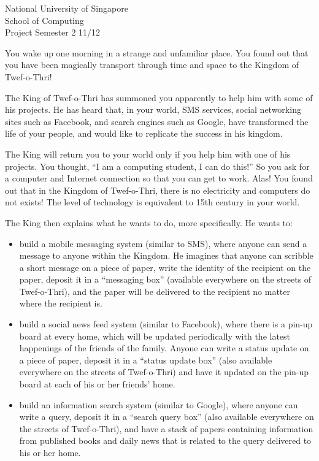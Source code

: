\documentclass[answers,a4paper,11pt]{exam}
\begin{document}
\extraheadheight{.5in}
%
{\large\sf National University of Singapore\\ School of Computing \\
\LARGE\sf Project}%
{\large\sf Semester 2 11/12}
\firstpageheadrule
\pagestyle{headandfoot}

You wake up one morning in a strange and unfamiliar place.  You found out that you have been magically transport through time and space to the Kingdom of Twef-o-Thri!  

The King of Twef-o-Thri has summoned you apparently to help him with some of his projects.  He has heard that, in your world, SMS services, social networking sites such as Facebook, and search engines such as Google, have transformed the life of your people, and would like to replicate the success in his kingdom.  

The King will return you to your world only if you help him with one of his projects.  You thought, ``I am a computing student, I can do this!'' So you ask for a computer and Internet connection so that you can get to work.  Alas!  You found out that in the Kingdom of Twef-o-Thri, there is no electricity and computers do not exists!  The level of technology is equivalent to 15th century in your world.

The King then explains what he wants to do, more specifically.  He wants to:

\begin{itemize}
\item
build a mobile messaging system (similar to SMS), where anyone can send a message to anyone within the Kingdom.  He imagines that anyone can scribble a short message on a piece of paper, write the identity of the recipient on the paper, deposit it in a “messaging box” (available everywhere on the streets of Twef-o-Thri), and the paper will be delivered to the recipient no matter where the recipient is.
\item
build a social news feed system (similar to Facebook), where there is a pin-up board at every home, which will be updated periodically with the latest happenings of the friends of the family.  Anyone can write a status update on a piece of paper, deposit it in a “status update box” (also available everywhere on the streets of Twef-o-Thri) and have it updated on the pin-up board at each of his or her friends’ home.  
\item
build an information search system (similar to Google), where anyone can write a query, deposit it in a “search query box” (also available everywhere on the streets of Twef-o-Thri), and have a stack of papers containing information from published books and daily news that is related to the query delivered to his or her home. 
\end{itemize}
\end{document}
